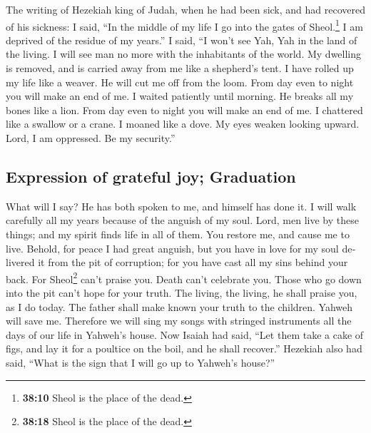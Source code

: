 \begin{paracol}{2}
\begin{otherlanguage}{english}
 The writing of Hezekiah king of Judah, when he had been
sick, and had recovered of his sickness:  I said, ``In
the middle of my life I go into the gates of Sheol.\footnote{\textbf{38:10}
  Sheol is the place of the dead.} I am deprived of the residue of my
years.''  I said, ``I won't see Yah, Yah in the land of
the living. I will see man no more with the inhabitants of the world.
 My dwelling is removed, and is carried away from me like
a shepherd's tent. I have rolled up my life like a weaver. He will cut
me off from the loom. From day even to night you will make an end of me.
 I waited patiently until morning. He breaks all my bones
like a lion. From day even to night you will make an end of me.
 I chattered like a swallow or a crane. I moaned like a
dove. My eyes weaken looking upward. Lord, I am oppressed. Be my
security.''

\hypertarget{expression-of-grateful-joy-graduation}{%
\subsection{Expression of grateful joy;
Graduation}\label{expression-of-grateful-joy-graduation}}

 What will I say? He has both spoken to me, and himself
has done it. I will walk carefully all my years because of the anguish
of my soul.  Lord, men live by these things; and my
spirit finds life in all of them. You restore me, and cause me to live.
 Behold, for peace I had great anguish, but you have in
love for my soul delivered it from the pit of corruption; for you have
cast all my sins behind your back.  For Sheol\footnote{\textbf{38:18}
  Sheol is the place of the dead.} can't praise you. Death can't
celebrate you. Those who go down into the pit can't hope for your truth.
 The living, the living, he shall praise you, as I do
today. The father shall make known your truth to the children.
 Yahweh will save me. Therefore we will sing my songs
with stringed instruments all the days of our life in Yahweh's house.
 Now Isaiah had said, ``Let them take a cake of figs, and
lay it for a poultice on the boil, and he shall recover.''
 Hezekiah also had said, ``What is the sign that I will
go up to Yahweh's house?''

\end{otherlanguage}


\end{paracol}
